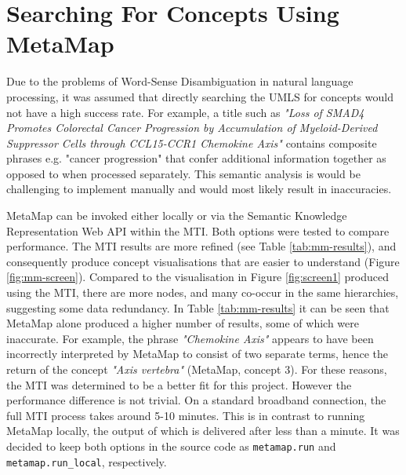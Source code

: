 \documentclass[Report.tex]{subfiles}
\begin{document}
\section{Searching For Concepts Using MetaMap}
Due to the problems of Word-Sense Disambiguation in natural language processing, it was assumed that directly searching the UMLS for concepts would not have a high success rate. For example, a title such as \emph{"Loss of SMAD4 Promotes Colorectal Cancer Progression by Accumulation of Myeloid-Derived Suppressor Cells through CCL15-CCR1 Chemokine Axis"} contains composite phrases e.g. "cancer progression" that confer additional information together as opposed to when processed separately. This semantic analysis is would be challenging to implement manually and would most likely result in inaccuracies. \newline

\noindent MetaMap can be invoked either locally or via the Semantic Knowledge Representation Web API within the MTI. Both options were tested to compare performance. The MTI results are more refined (see Table \ref{tab:mm-results}), and consequently produce concept visualisations that are easier to understand (Figure \ref{fig:mm-screen}). Compared to the visualisation in Figure \ref{fig:screen1} produced using the MTI, there are more nodes, and many co-occur in the same hierarchies, suggesting some data redundancy. In Table \ref{tab:mm-results} it can be seen that MetaMap alone produced a higher number of results, some of which were inaccurate. For example, the phrase \emph{"Chemokine Axis"} appears to have been incorrectly interpreted by MetaMap to consist of two separate terms, hence the return of the concept \emph{"Axis vertebra"} (MetaMap, concept 3). For these reasons, the MTI was determined to be a better fit for this project. However the performance difference is not trivial. On a standard broadband connection, the full MTI process takes around 5-10 minutes. This is in contrast to running MetaMap locally, the output of which is delivered after less than a minute. It was decided to keep both options in the source code as \texttt{metamap.run} and \texttt{metamap.run_local}, respectively.
\end{document}
